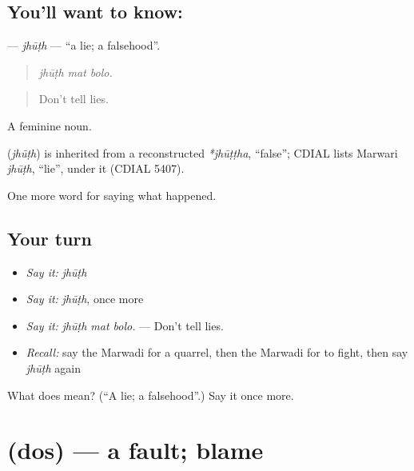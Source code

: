 \subsection*{You'll want to know: }
\textbf{} — \emph{jhūṭh} — \textquotedblleft{}a lie; a falsehood\textquotedblright{}.

\begin{quote}
  
\end{quote}

\begin{quote}
\emph{jhūṭh mat bolo.}
\end{quote}

\begin{quote}
Don't tell lies.
\end{quote}

A feminine noun.

\begin{cousinweb}
\textbf{} (\emph{jhūṭh}) is inherited from a reconstructed \emph{*jhūṭṭha}, \textquotedblleft{}false\textquotedblright{}; CDIAL lists Marwari \emph{jhūṭh}, \textquotedblleft{}lie\textquotedblright{}, under it (CDIAL 5407).
\end{cousinweb}

\begin{grammarlens}[title={What you've built}]
One more word for saying what happened.
\end{grammarlens}

\subsection*{Your turn}
\begin{itemize}
\raggedright
  \item \emph{Say it:} \emph{jhūṭh}
  \item \emph{Say it:} \emph{jhūṭh}, once more
  \item \emph{Say it:} \emph{jhūṭh mat bolo.} — Don't tell lies.
  \item \emph{Recall:} say the Marwadi for a quarrel, then the Marwadi for to fight, then say \emph{jhūṭh} again
\end{itemize}

\begin{tcolorbox}[breakable,colback=teal!4,colframe=teal!35!black,title={Before you move on}]
What does  mean? (\textquotedblleft{}A lie; a falsehood\textquotedblright{}.) Say it once more.
\end{tcolorbox}
\section[\texorpdfstring{\mw{दोस} (dos)}{दोस (dos)}]{ (dos) — a fault; blame}

